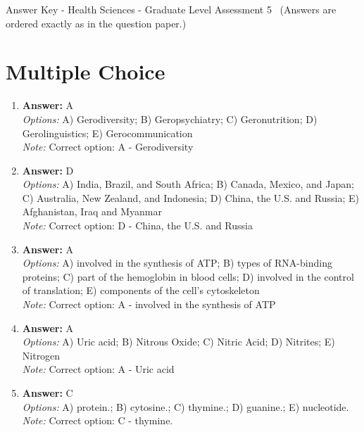 \documentclass[12pt]{article}
\begin{document}
\begin{center}
Answer Key - Health Sciences - Graduate Level Assessment 5 \
\small (Answers are ordered exactly as in the question paper.)
\end{center}

\section*{Multiple Choice}
\begin{enumerate}[label=\arabic*.]
\item \textbf{Answer:} A
\\ \textit{Options:} A) Gerodiversity; B) Geropsychiatry; C) Geronutrition; D) Gerolinguistics; E) Gerocommunication
\\ \textit{Note:} Correct option: A - Gerodiversity
\item \textbf{Answer:} D
\\ \textit{Options:} A) India, Brazil, and South Africa; B) Canada, Mexico, and Japan; C) Australia, New Zealand, and Indonesia; D) China, the U.S. and Russia; E) Afghanistan, Iraq and Myanmar
\\ \textit{Note:} Correct option: D - China, the U.S. and Russia
\item \textbf{Answer:} A
\\ \textit{Options:} A) involved in the synthesis of ATP; B) types of RNA-binding proteins; C) part of the hemoglobin in blood cells; D) involved in the control of translation; E) components of the cell's cytoskeleton
\\ \textit{Note:} Correct option: A - involved in the synthesis of ATP
\item \textbf{Answer:} A
\\ \textit{Options:} A) Uric acid; B) Nitrous Oxide; C) Nitric Acid; D) Nitrites; E) Nitrogen
\\ \textit{Note:} Correct option: A - Uric acid
\item \textbf{Answer:} C
\\ \textit{Options:} A) protein.; B) cytosine.; C) thymine.; D) guanine.; E) nucleotide.
\\ \textit{Note:} Correct option: C - thymine.
\end{enumerate}
\end{document}
